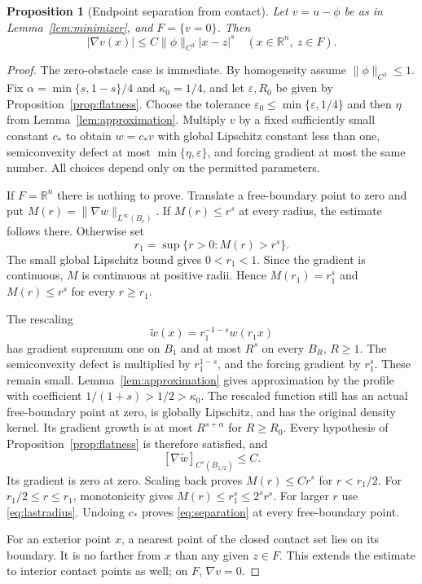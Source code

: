 \documentclass[11pt]{article}
\numberwithin{equation}{section}
\newtheorem{proposition}[theorem]{Proposition}
\theoremstyle{remark}
\newcommand{\R}{\mathbb R}
\newcommand{\norm}[1]{\lVert #1\rVert}
\newcommand{\abs}[1]{\lvert #1\rvert}
\begin{document}
\begin{proposition}[Endpoint separation from contact]\label{prop:separation}
Let $v=u-\phi$ be as in Lemma~\ref{lem:minimizer}, and $F=\{v=0\}$. Then
\begin{equation}\label{eq:separation}
 \abs{\nabla v(x)}\le C\norm\phi_{C^3}\abs{x-z}^s
 \quad(x\in\R^n,\ z\in F).
\end{equation}
\end{proposition}
\begin{proof}
The zero-obstacle case is immediate. By homogeneity assume $\norm\phi_{C^3}\le1$. Fix
$\alpha=\min\{s,1-s\}/4$ and $\kappa_0=1/4$, and let $\varepsilon,R_0$ be given by Proposition~\ref{prop:flatness}. Choose the tolerance $\varepsilon_0\le\min\{\varepsilon,1/4\}$ and then $\eta$ from Lemma~\ref{lem:approximation}. Multiply $v$ by a fixed sufficiently small constant $c_*$ to obtain $w=c_*v$ with global Lipschitz constant less than one, semiconvexity defect at most $\min\{\eta,\varepsilon\}$, and forcing gradient at most the same number. All choices depend only on the permitted parameters.

If $F=\R^n$ there is nothing to prove. Translate a free-boundary point to zero and put $M(r)=\norm{\nabla w}_{L^\infty(B_r)}$. If $M(r)\le r^s$ at every radius, the estimate follows there. Otherwise set
\begin{equation}\label{eq:lastradius}
 r_1=\sup\{r>0:M(r)>r^s\}.
\end{equation}
The small global Lipschitz bound gives $0<r_1<1$. Since the gradient is continuous, $M$ is continuous at positive radii. Hence $M(r_1)=r_1^s$ and $M(r)\le r^s$ for every $r\ge r_1$.

The rescaling
\[
 \widetilde w(x)=r_1^{-1-s}w(r_1x)
\]
has gradient supremum one on $B_1$ and at most $R^s$ on every $B_R$, $R\ge1$. The semiconvexity defect is multiplied by $r_1^{1-s}$, and the forcing gradient by $r_1^s$. These remain small. Lemma~\ref{lem:approximation} gives approximation by the profile with coefficient $1/(1+s)>1/2>\kappa_0$. The rescaled function still has an actual free-boundary point at zero, is globally Lipschitz, and has the original density kernel. Its gradient growth is at most $R^{s+\alpha}$ for $R\ge R_0$. Every hypothesis of Proposition~\ref{prop:flatness} is therefore satisfied, and
\[
 [\nabla\widetilde w]_{C^s(B_{1/2})}\le C.
\]
Its gradient is zero at zero. Scaling back proves $M(r)\le Cr^s$ for $r<r_1/2$. For $r_1/2\le r\le r_1$, monotonicity gives $M(r)\le r_1^s\le2^sr^s$. For larger $r$ use \eqref{eq:lastradius}. Undoing $c_*$ proves \eqref{eq:separation} at every free-boundary point.

For an exterior point $x$, a nearest point of the closed contact set lies on its boundary. It is no farther from $x$ than any given $z\in F$. This extends the estimate to interior contact points as well; on $F$, $\nabla v=0$.
\end{proof}
\end{document}
